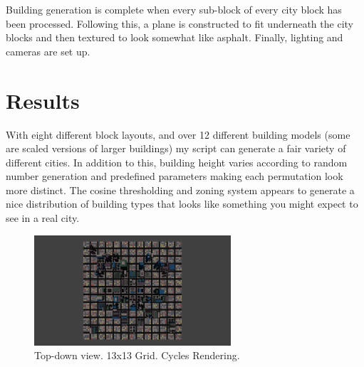 \documentclass{article}
\begin{document}
Building generation is complete when every sub-block of every city block has been processed. Following this, a plane is constructed to fit underneath the city blocks and then textured to look somewhat like asphalt. Finally, lighting and cameras are set up.


\section{Results}

With eight different block layouts, and over 12 different building models (some are scaled versions of larger buildings) my script can generate a fair variety of different cities. In addition to this, building height varies according to random number generation and predefined parameters making each permutation look more distinct. The cosine thresholding and zoning system appears to generate a nice distribution of building types that looks like something you might expect to see in a real city. 

\begin{figure}[H]
\begin{center}
\includegraphics[width=0.65\textwidth]{render13_cycles0} %
\caption{Top-down view. 13x13 Grid. Cycles Rendering.}
\end{center}
\end{figure}
\end{document}
